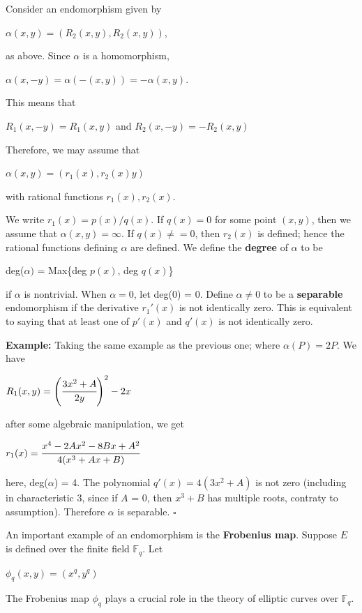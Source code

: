 \documentclass[a4paper, 12pt]{article}
\begin{document}
Consider an endomorphism given by
\begin{center} $\alpha(x,y)=(R_2(x,y),R_2(x,y))$, \end{center}
as above. Since $\alpha$ is a homomorphism,
\begin{center} $\alpha(x,-y)=\alpha(-(x,y))=-\alpha(x,y). $\end{center}
This means that
\begin{center} $R_1(x,-y)=R_1(x,y)$ \quad and \quad $R_2(x,-y)=-R_2(x,y)$ \end{center}
Therefore, we may assume that
\begin{center} $\alpha(x,y)=(r_1(x),r_2(x)y)$ \end{center}
with rational functions $r_1(x), r_2(x)$.\par
We write $r_1(x)=p(x)/q(x)$. If $q(x) = 0$ for some point $(x,y)$, then we assume that $\alpha(x,y) = \infty$. If $q(x)\neq =0$, then $r_2(x)$ is defined; hence the rational functions defining $\alpha$ are defined.\newline
We define the \textbf{degree} of $\alpha$ to be
\begin{center} deg($\alpha)$ = Max\{deg $p(x)$, deg $q(x)$\} \end{center}
if $\alpha$ is nontrivial. When $\alpha = 0$, let deg(0) = 0. Define $\alpha \neq 0$ to be a \textbf{separable} endomorphism if the derivative $r_1'(x)$ is not identically zero. This is equivalent to saying that at least one of $p'(x)$ and $q'(x)$ is not identically zero.\par
\textbf{Example:}\newline
Taking the same example as the previous one; where $\alpha(P)=2P$. We have
\begin{center} $R_1(x,y)=\left(\cfrac{3x^2+A}{2y}\right)^2 - 2x$ \end{center}
after some algebraic manipulation, we get
\begin{center} $r_1(x) = \cfrac{x^4-2Ax^2-8Bx+A^2}{4(x^3+Ax+B)}$ \end{center}
here, deg($\alpha$) = 4. The polynomial $q'(x) = 4(3x^2+A)$ is not zero (including in characteristic 3, since if $A$ = 0, then $x^3+B$ has multiple roots, contraty to assumption). Therefore $\alpha$ is separable. $\square$ \par
An important example of an endomorphism is the \textbf{Frobenius map}.\newline
Suppose $E$ is defined over the finite field $\mathbb{F}_q$. Let
\begin{center} $\phi_q(x, y) = (x^q, y^q)$ \end{center}
The Frobenius map $\phi_q$ plays a crucial role in the theory of elliptic curves over $\mathbb{F}_q$.
\end{document}
